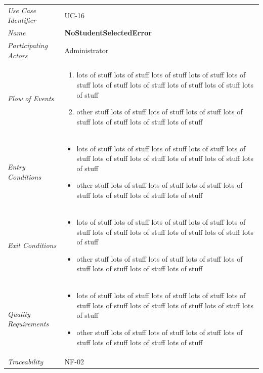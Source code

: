 \documentclass[12pt,letterpaper]{article}
\begin{document}
\begin{center}
	\begin{tabu} to 
		\toprule
		Use Case Identifier & UC-16 \\
		Name & {\bf NoStudentSelectedError} \\
		Participating Actors & Administrator \\
		Flow of Events & 
	    \begin{enumerate}[topsep=-1em]
		    \item lots of stuff lots of stuff lots of stuff lots of stuff lots of stuff lots of stuff lots of stuff lots of stuff lots of stuff lots of stuff
		    \item other stuff lots of stuff lots of stuff lots of stuff lots of stuff lots of stuff lots of stuff lots of stuff
		\end{enumerate} \\

		Entry Conditions &
		\begin{itemize}[topsep=-1em]
		    \item lots of stuff lots of stuff lots of stuff lots of stuff lots of stuff lots of stuff lots of stuff lots of stuff lots of stuff lots of stuff
		    \item other stuff lots of stuff lots of stuff lots of stuff lots of stuff lots of stuff lots of stuff lots of stuff
        \end{itemize} \\

		Exit Conditions &
		\begin{itemize}[topsep=-1em]
		    \item lots of stuff lots of stuff lots of stuff lots of stuff lots of stuff lots of stuff lots of stuff lots of stuff lots of stuff lots of stuff
		    \item other stuff lots of stuff lots of stuff lots of stuff lots of stuff lots of stuff lots of stuff lots of stuff
        \end{itemize} \\

		Quality Requirements &
		\begin{itemize}[topsep=-1em]
		    \item lots of stuff lots of stuff lots of stuff lots of stuff lots of stuff lots of stuff lots of stuff lots of stuff lots of stuff lots of stuff
		    \item other stuff lots of stuff lots of stuff lots of stuff lots of stuff lots of stuff lots of stuff lots of stuff
        \end{itemize} \\

		Traceability & NF-02 \\
		\toprule
	\end{tabu}
\end{center}
\end{document}
